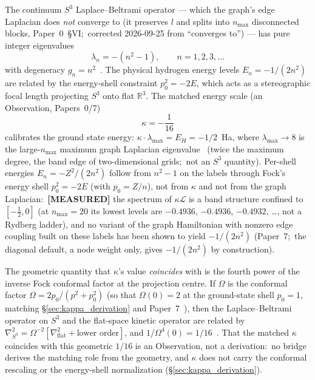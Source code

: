 \documentclass[aps,pra,twocolumn,superscriptaddress,longbibliography]{revtex4-2}
\begin{document}
The continuum $S^3$ Laplace--Beltrami operator --- which the graph's
edge Laplacian does \emph{not} converge to (it preserves $l$ and splits
into $n_{\max}$ disconnected blocks, Paper~0~\S VI;\ corrected
2026-09-25 from ``converges to'') --- has pure
integer eigenvalues
\begin{equation}
  \lambda_n = -(n^2 - 1), \qquad n = 1, 2, 3, \ldots
  \label{eq:s3_eigenvalues}
\end{equation}
with degeneracy $g_n = n^2$~\cite{loutey_paper7}.  The physical
hydrogen energy levels $E_n = -1/(2n^2)$ are related by the
energy-shell constraint $p_0^2 = -2E$, which acts as a
stereographic focal length projecting $S^3$ onto flat
$\mathbb{R}^3$.  The matched energy scale (an Observation, Papers~0/7)
\begin{equation}
  \kappa = -\frac{1}{16}
  \label{eq:kappa}
\end{equation}
calibrates the ground state energy:
$\kappa \cdot \lambda_{\max} = E_H = -1/2$~Ha, where
$\lambda_{\max} \to 8$ is the large-$n_{\max}$ maximum graph Laplacian
eigenvalue~\cite{loutey_paper0} (twice the maximum degree, the band edge
of two-dimensional grids;\ not an $S^3$ quantity).  Per-shell energies
$E_n = -Z^2/(2n^2)$ follow from $n^2 - 1$ on the labels through Fock's
energy shell $p_0^2 = -2E$ (with $p_0 = Z/n$), not from $\kappa$ and not
from the graph Laplacian:\ \textbf{[MEASURED]} the spectrum of
$\kappa\mathcal{L}$ is a band structure confined to $[-\tfrac12, 0]$
(at $n_{\max} = 20$ its lowest levels are $-0.4936$, $-0.4936$,
$-0.4932$, \ldots, not a Rydberg ladder), and no variant of the graph
Hamiltonian with nonzero edge coupling built on these labels has been
shown to yield $-1/(2n^2)$ (Paper~7;\ the diagonal default, a node
weight only, gives $-1/(2n^2)$ by construction).

The geometric quantity that $\kappa$'s value \emph{coincides} with is
the fourth power of the inverse Fock conformal factor at the projection centre.  If $\Omega$
is the conformal factor $\Omega = 2p_0/(p^2 + p_0^2)$ (so that
$\Omega(0) = 2$ at the ground-state shell $p_0 = 1$, matching
\S\ref{sec:kappa_derivation} and Paper~7~\cite{loutey_paper7}), then
the Laplace--Beltrami operator on $S^3$ and the flat-space
kinetic operator are related by
$\nabla^2_{S^3} = \Omega^{-2}[\nabla^2_{\mathrm{flat}} + \text{lower order}]$,
and $1/\Omega^4(0) = 1/16$~\cite{loutey_paper7}.  That the matched
$\kappa$ coincides with this geometric $1/16$ is an Observation, not a
derivation:\ no bridge derives the matching role from the geometry, and
$\kappa$ does not carry the conformal rescaling or the energy-shell
normalization (\S\ref{sec:kappa_derivation}).
\end{document}
